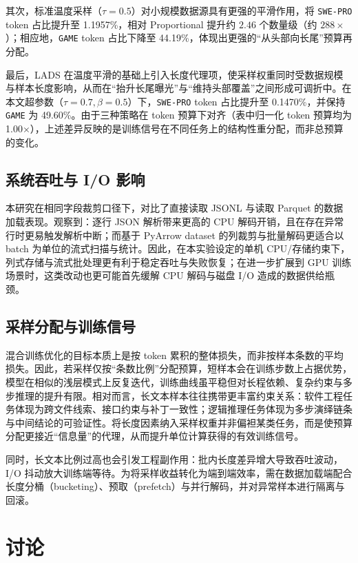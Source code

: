 \documentclass[UTF8]{article}
\begin{document}
其次，标准温度采样（$\tau=0.5$）对小规模数据源具有更强的平滑作用，将 \texttt{SWE-PRO} token 占比提升至 1.1957\%，相对 Proportional 提升约 $2.46$ 个数量级（约 $288\times$）；相应地，\texttt{GAME} token 占比下降至 44.19\%，体现出更强的“从头部向长尾”预算再分配。

最后，LADS 在温度平滑的基础上引入长度代理项，使采样权重同时受数据规模与样本长度影响，从而在“抬升长尾曝光”与“维持头部覆盖”之间形成可调折中。在本文超参数（$\tau=0.7,\beta=0.5$）下，\texttt{SWE-PRO} token 占比提升至 0.1470\%，并保持 \texttt{GAME} 为 49.60\%。由于三种策略在 token 预算下对齐（表中归一化 token 预算均为 1.00$\times$），上述差异反映的是训练信号在不同任务上的结构性重分配，而非总预算的变化。


\subsection{系统吞吐与 I/O 影响}\label{sec:system_perf}

本研究在相同字段裁剪口径下，对比了直接读取 JSONL 与读取 Parquet 的数据加载表现。观察到：逐行 JSON 解析带来更高的 CPU 解码开销，且在存在异常行时更易触发解析中断；而基于 PyArrow dataset 的列裁剪与批量解码更适合以 batch 为单位的流式扫描与统计。因此，在本实验设定的单机 CPU/存储约束下，列式存储与流式批处理更有利于稳定吞吐与失败恢复；在进一步扩展到 GPU 训练场景时，这类改动也更可能首先缓解 CPU 解码与磁盘 I/O 造成的数据供给瓶颈。


\subsection{采样分配与训练信号}\label{sec:signal_allocation}

混合训练优化的目标本质上是按 token 累积的整体损失，而非按样本条数的平均损失。因此，若采样仅按“条数比例”分配预算，短样本会在训练步数上占据优势，模型在相似的浅层模式上反复迭代，训练曲线虽平稳但对长程依赖、复杂约束与多步推理的提升有限。相对而言，长文本样本往往携带更丰富约束关系：软件工程任务体现为跨文件线索、接口约束与补丁一致性；逻辑推理任务体现为多步演绎链条与中间结论的可验证性。将长度因素纳入采样权重并非偏袒某类任务，而是使预算分配更接近“信息量”的代理，从而提升单位计算获得的有效训练信号。

同时，长文本比例过高也会引发工程副作用：批内长度差异增大导致吞吐波动，I/O 抖动放大训练端等待。为将采样收益转化为端到端效率，需在数据加载端配合长度分桶（bucketing）、预取（prefetch）与并行解码，并对异常样本进行隔离与回滚。



\section{讨论}\label{sec:discussion}
\end{document}
